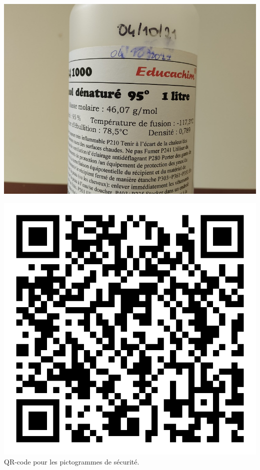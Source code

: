 \begin{minipage}{0.5\textwidth}
\centering
    \includegraphics[scale=0.3]{Images/TP1/Bouteille_ethanol.jpg}
\end{minipage}
\begin{minipage}{0.5\textwidth}
\centering
    \includegraphics[scale=0.3]{Images/TP1/qrcode_picto.png}
    \\
    QR-code pour les pictogrammes de sécurité.
\end{minipage}


